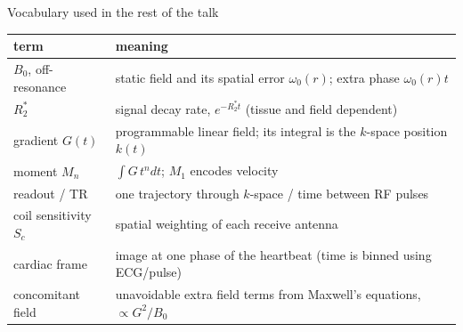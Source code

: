 \iflong
\begin{frame}{Vocabulary used in the rest of the talk}
\small
\centering
\begin{tabular}{@{}p{3.2cm}p{9.5cm}@{}}\toprule
term & meaning\\\midrule
$B_0$, off-resonance & static field and its spatial error $\omega_0(r)$; extra phase $\omega_0(r)t$\\
$R_2^*$ & signal decay rate, $e^{-R_2^*t}$ (tissue and field dependent)\\
gradient $G(t)$ & programmable linear field; its integral is the $k$-space position $k(t)$\\
moment $M_n$ & $\int G\,t^n dt$; $M_1$ encodes velocity\\
readout / TR & one trajectory through $k$-space / time between RF pulses\\
coil sensitivity $S_c$ & spatial weighting of each receive antenna\\
cardiac frame & image at one phase of the heartbeat (time is binned using ECG/pulse)\\
concomitant field & unavoidable extra field terms from Maxwell's equations, $\propto G^2/B_0$\\
\bottomrule\end{tabular}
\end{frame}
\fi
